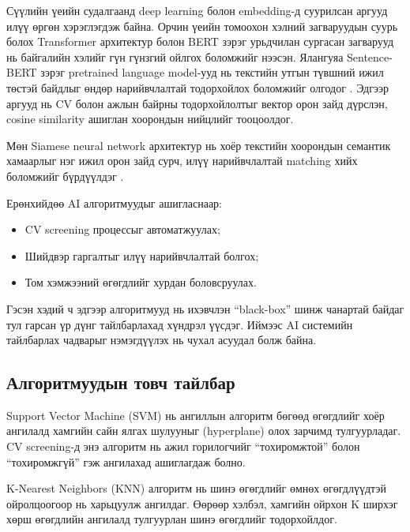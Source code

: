\par{}Сүүлийн үеийн судалгаанд deep learning болон embedding-д суурилсан аргууд илүү өргөн хэрэглэгдэж байна. Орчин үеийн томоохон хэлний загваруудын суурь болох Transformer архитектур \cite{vaswani2017attention} болон BERT зэрэг урьдчилан сургасан загварууд \cite{devlin2019bert} нь байгалийн хэлийг гүн гүнзгий ойлгох боломжийг нээсэн. Ялангуяа Sentence-BERT зэрэг pretrained language model-ууд нь текстийн утгын түвшний ижил төстэй байдлыг өндөр нарийвчлалтай тодорхойлох боломжийг олгодог \cite{reimers2019sentencebert}. Эдгээр аргууд нь CV болон ажлын байрны тодорхойлолтыг вектор орон зайд дүрслэн, cosine similarity ашиглан хоорондын нийцлийг тооцоолдог.

\par{}Мөн Siamese neural network архитектур нь хоёр текстийн хоорондын семантик хамаарлыг нэг ижил орон зайд сурч, илүү нарийвчлалтай matching хийх боломжийг бүрдүүлдэг \cite{resume_matching_siamese}.

Ерөнхийдөө AI алгоритмуудыг ашигласнаар:
\begin{itemize}
    \item CV screening процессыг автоматжуулах;
    \item Шийдвэр гаргалтыг илүү нарийвчлалтай болгох;
    \item Том хэмжээний өгөгдлийг хурдан боловсруулах.
\end{itemize}

\par{}Гэсэн хэдий ч эдгээр алгоритмууд нь ихэвчлэн “black-box” шинж чанартай байдаг тул гарсан үр дүнг тайлбарлахад хүндрэл үүсдэг. Иймээс AI системийн тайлбарлах чадварыг нэмэгдүүлэх нь чухал асуудал болж байна.
\subsection*{Алгоритмуудын товч тайлбар}

\par{}Support Vector Machine (SVM) нь ангиллын алгоритм бөгөөд өгөгдлийг хоёр ангилалд хамгийн сайн ялгах шулууныг (hyperplane) олох зарчимд тулгуурладаг. CV screening-д энэ алгоритм нь ажил горилогчийг “тохиромжтой” болон “тохиромжгүй” гэж ангилахад ашиглагдаж болно.

\par{}K-Nearest Neighbors (KNN) алгоритм нь шинэ өгөгдлийг өмнөх өгөгдлүүдтэй ойролцоогоор нь харьцуулж ангилдаг. Өөрөөр хэлбэл, хамгийн ойрхон K ширхэг хөрш өгөгдлийн ангилалд тулгуурлан шинэ өгөгдлийг тодорхойлдог.


